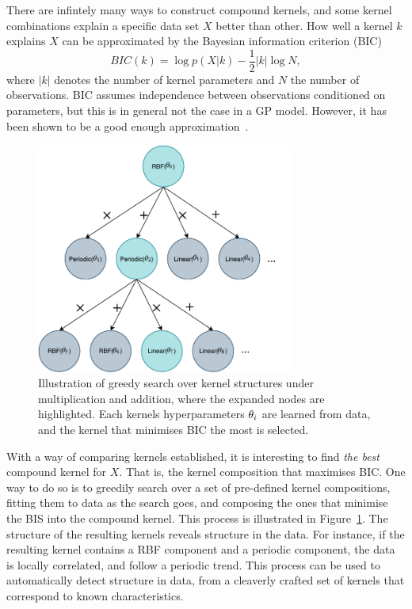 There are infintely many ways to construct compound kernels, and some
kernel combinations explain a specific data set $X$ better than
other. How well a kernel $k$ explains $X$ can be approximated
by the Bayesian information criterion (BIC)
\begin{equation}
  BIC(k) = \log p(X \vert k) - \frac{1}{2} \vert k \vert \log N,
\end{equation}
where $\vert k \vert$ denotes the number of kernel parameters and $N$
the number of observations. BIC assumes independence between
observations conditioned on parameters, but this is in general not the
case in a GP model. However, it has been shown to be a good enough approximation~\cite{duvenaud2013structure}.
\begin{figure}
  \centering
  \includegraphics[width=0.75\textwidth]{figures/compound-kernel-search}
  \caption{Illustration of greedy search over kernel structures under
    multiplication and addition, where the
    expanded nodes are highlighted. Each kernels hyperparameters
    $\theta_i$ are learned from data, and the kernel that
    minimises BIC the most is selected.}\label{fig:compound-kernel-search}
\end{figure}

With a way of comparing kernels established, it is interesting to find
\textit{the best} compound kernel for $X$. That is, the kernel
composition that maximises BIC. One way to do so is to
greedily search over a set of pre-defined kernel compositions, fitting
them to data as the search goes, and composing the ones that minimise
the BIS into the compound kernel. This process is illustrated in Figure~\ref{fig:compound-kernel-search}.
The structure of the resulting kernels reveals structure in the
data. For instance, if the resulting kernel contains a RBF component and a periodic
component, the data is locally correlated, and follow a periodic
trend. This process can be used to automatically detect structure in
data, from a cleaverly crafted set of kernels that correspond to
known characteristics.

